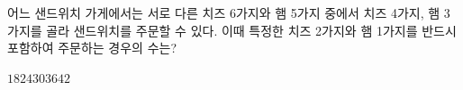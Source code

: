 어느 샌드위치 가게에서는 서로 다른 치즈 6가지와 햄 5가지 중에서 치즈 4가지, 햄 3가지를 골라 샌드위치를 주문할 수 있다. 이때 특정한 치즈 2가지와 햄 1가지를 반드시 포함하여 주문하는 경우의 수는?
\begin{choices32}{$18$}{$24$}{$30$}{$36$}{$42$}\end{choices32}
